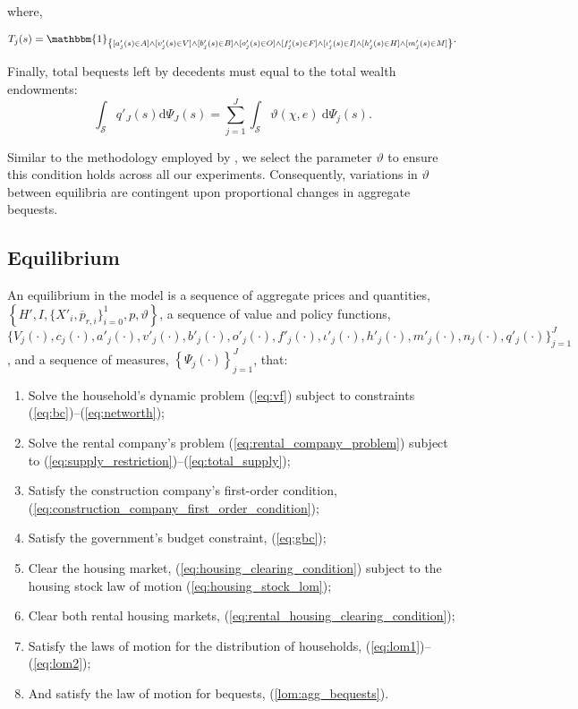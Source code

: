 \documentclass[parskip=full]{article}
\newcommand{\indicator}[1]{\mathbbm{1}_{\left\{ {#1} \right\} }}
\begin{document}
\noindent where,

\begin{align}
    T_{j}(s) = \indicator{[a'_{j}(s)\in A] \land [v'_{j}(s)\in V] \land [b'_{j}(s)\in B] \land [o'_{j}(s)\in O] \land [f'_{j}(s)\in F] \land [\iota'_{j}(s)\in I] \land [h'_{j}(s) \in H] \land [m'_{j}(s) \in M]}.\notag
\end{align}

Finally, total bequests left by decedents must equal to the total wealth endowments:
\begin{equation}
\label{lom:agg_bequests}
      \int_{\mathcal{S}} q'_{J}(s) \mathrm{d}\Psi_{J}(s) =  \sum_{j=1}^J \int_{\mathcal{S}} \vartheta (\chi,e)\ \mathrm{d}\Psi_j(s).
\end{equation}

\noindent Similar to the methodology employed by \citet{kkk-2021}, we select the parameter $\vartheta$ to ensure this condition holds across all our experiments. Consequently, variations in $\vartheta$ between equilibria are contingent upon proportional changes in aggregate bequests.

\subsection{Equilibrium}
An equilibrium in the model is a sequence of aggregate prices and quantities, $\left\{H',I,\{X'_{i},\overline{p}_{r,i}\}^{1}_{i=0},p,\vartheta \right\}$, a sequence of value and policy functions, $\biggl\{V_{j}(\cdot),c_{j}(\cdot),a'_{j}(\cdot),v'_{j}(\cdot),b'_{j}(\cdot),o'_{j}(\cdot),f'_{j}(\cdot),\iota'_{j}(\cdot),h'_{j}(\cdot),m'_{j}(\cdot),n_{j}(\cdot),q'_{j}(\cdot)\biggl\}_{j=1}^J$, and a sequence of measures, $\left\{\Psi_{j}(\cdot)\right\}_{j=1}^J$, that:
\begin{enumerate}
\item Solve the household's dynamic problem (\ref{eq:vf}) subject to constraints (\ref{eq:bc})--(\ref{eq:networth});
\item Solve the rental company's problem (\ref{eq:rental_company_problem}) subject to (\ref{eq:supply_restriction})--(\ref{eq:total_supply});
\item Satisfy the construction company's first-order condition, (\ref{eq:construction_company_first_order_condition});
\item Satisfy the government's budget constraint, (\ref{eq:gbc});
\item Clear the housing market,
(\ref{eq:housing_clearing_condition}) subject to the housing stock law of motion (\ref{eq:housing_stock_lom});
\item Clear both rental housing markets,
(\ref{eq:rental_housing_clearing_condition});
\item Satisfy the laws of motion for the distribution of households, (\ref{eq:lom1})--(\ref{eq:lom2});
\item And satisfy the law of motion for bequests, (\ref{lom:agg_bequests}).
\end{enumerate}
\end{document}
